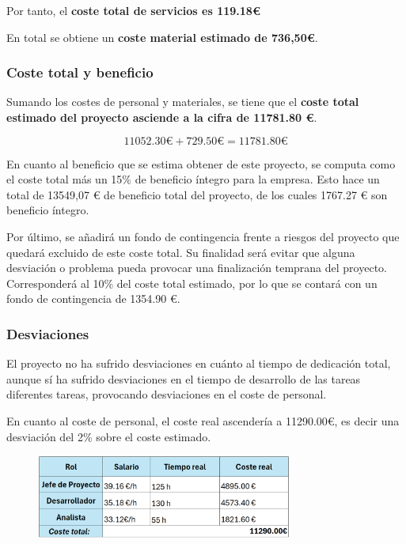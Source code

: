 Por tanto, el \textbf{coste total de servicios es 119.18€}

En total se obtiene un \textbf{coste material estimado de 736,50€}.

\subsubsection{Coste total y beneficio}

Sumando los costes de personal y materiales, se tiene que el \textbf{coste total estimado del proyecto asciende a la cifra de 11781.80 €}.

\begin{equation}
    11052.30\text{€} + 729.50\text{€} =  11781.80 \text{€}
\end{equation}

En cuanto al beneficio que se estima obtener de este proyecto, se computa como el coste total más un 15\% de beneficio íntegro para la empresa. Esto hace un total de 13549,07 € de beneficio total del proyecto, de los cuales 1767.27 € son beneficio íntegro.

Por último, se añadirá un fondo de contingencia frente a riesgos del proyecto que quedará excluido de este coste total. Su finalidad será evitar que alguna desviación o problema pueda provocar una finalización temprana del proyecto. Corresponderá al 10\% del coste total estimado, por lo que se contará con un fondo de contingencia de 1354.90 €.

\subsubsection{Desviaciones}

El proyecto no ha sufrido desviaciones en cuánto al tiempo de dedicación total, aunque sí ha sufrido desviaciones en el tiempo de desarrollo de las tareas diferentes tareas, provocando desviaciones en el coste de personal.

En cuanto al coste de personal, el coste real ascendería a 11290.00€, es decir una desviación del 2\% sobre el coste estimado.%

\begin{figure}[H]
    \centering
    \includegraphics[width=0.75\textwidth]{tables/costeRealcap.png}
    \label{table:costeRealcap}
\end{figure}


